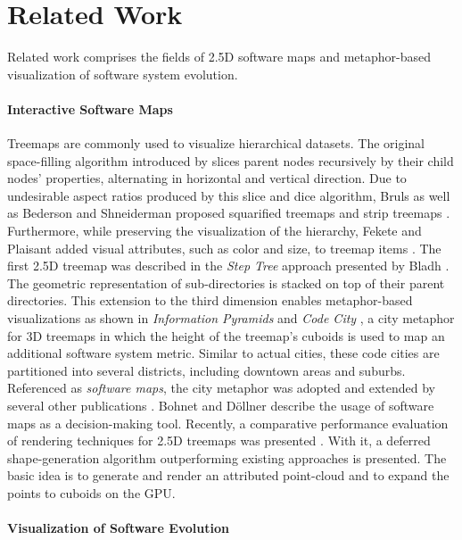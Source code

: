 
\section{Related Work}
\label{sec:related}
\noindent 
Related work comprises the fields of 2.5D software maps and metaphor-based visualization of software system evolution.

\paragraph*{Interactive Software Maps}

Treemaps are commonly used to visualize hierarchical datasets. 
The original space-filling algorithm introduced by \cite{Shneiderman1992} slices parent nodes recursively by their child nodes' properties, alternating in horizontal and vertical direction. 
Due to undesirable aspect ratios produced by this slice and dice algorithm, Bruls \etal as well as Bederson and Shneiderman proposed squarified treemaps \cite{Bruls1999} and strip treemaps \cite{Bederson2002}. 
Furthermore, while preserving the visualization of the hierarchy, Fekete and Plaisant added visual attributes, such as color and size, to treemap items \cite{Fekete2002}. 
The first 2.5D treemap was described in the \emph{Step Tree} approach presented by Bladh \etal \cite{Bladh2004}. 
The geometric representation of sub-directories is stacked on top of their parent directories. 
This extension to the third dimension enables metaphor-based visualizations as shown in \emph{Information Pyramids} \cite{Andrews1997} and \emph{Code City} \cite{Wettel2008}, a city metaphor for 3D treemaps in which the height of the treemap's cuboids is used to map an additional software system metric. 
Similar to actual cities, these code cities are partitioned into several districts, including downtown areas and suburbs.
Referenced as \emph{software maps}, the city metaphor was adopted and extended by several other publications \cite{Liggesmeyer2009,Bohnet2011}.
Bohnet and D{\"o}llner describe the usage of software maps as a decision-making tool.
Recently, a comparative performance evaluation of rendering techniques for 2.5D treemaps was presented \cite{Trapp2013}.
With it, a deferred shape-generation algorithm outperforming existing approaches is presented.
The basic idea is to generate and render an attributed point-cloud and to expand the points to cuboids on the GPU.

\paragraph*{Visualization of Software Evolution}

